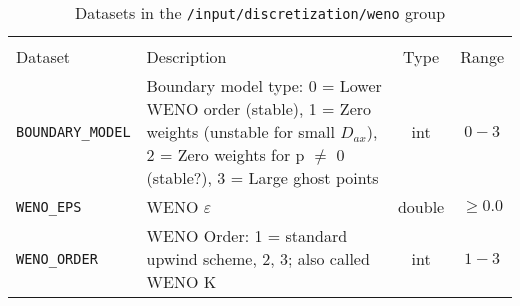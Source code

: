 \begin{table}[!ht]
\footnotesize
\begin{tabu}to \linewidth[m]{lX[m]cc} \toprule
{} \\
\rowfont[c]\normalfont Dataset & Description & Type & Range \everyrow{\midrule}\\
\texttt{BOUNDARY\_MODEL} & Boundary model type: 0 = Lower WENO order (stable), 1 = Zero weights (unstable for small $D_{ax}$), 2 = Zero weights for p $\neq$ 0 (stable?), 3 = Large ghost points & int & $0-3$\\
\texttt{WENO\_EPS} & WENO $\varepsilon$ & double & $\geq 0.0$\\
\texttt{WENO\_ORDER} & WENO Order: 1 = standard upwind scheme, 2, 3; also called WENO K & int & $1-3$ \everyrow{}\\
\bottomrule
\end{tabu}
\caption{\label{tab:FFDiscretizationWeno}Datasets in the \texttt{/input/discretization/weno} group}
\end{table}


